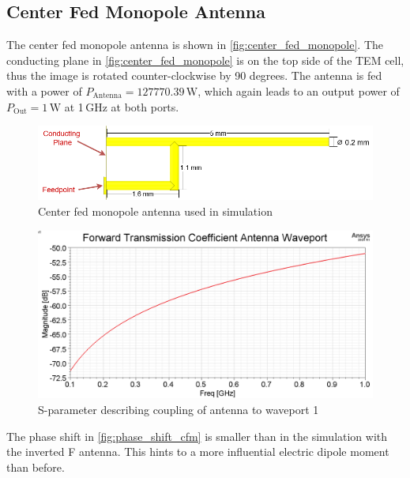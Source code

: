 \subsection{Center Fed Monopole Antenna}

The center fed monopole antenna is shown in \autoref{fig:center_fed_monopole}. The conducting plane in \autoref{fig:center_fed_monopole} is on the top side of the TEM cell, thus the image is rotated counter-clockwise by 90 degrees. The antenna is fed with a power of $P_\mathrm{Antenna}=127770.39\,\mathrm{W}$, which again leads to an output power of $P_\mathrm{Out}=1\,\mathrm{W}$ at 1\,GHz at both ports. 

\begin{figure}[h]
    \centering
    \includegraphics[width=0.75\linewidth]{Documentation//content//30_simulations//img/center_fed_monopole.png}
    \caption{Center fed monopole antenna used in simulation}
    \label{fig:center_fed_monopole}
\end{figure}

\begin{figure}[h]
    \centering
    \includegraphics[width=1\linewidth]{Documentation//content//30_simulations//img/forward_coeff_cfm.png}
    \caption{S-parameter describing coupling of antenna to waveport 1}
    \label{fig:orward_coeff_cfm}
\end{figure}

The phase shift in \autoref{fig:phase_shift_cfm} is smaller than in the simulation with the inverted F antenna. This hints to a more influential electric dipole moment than before. 

